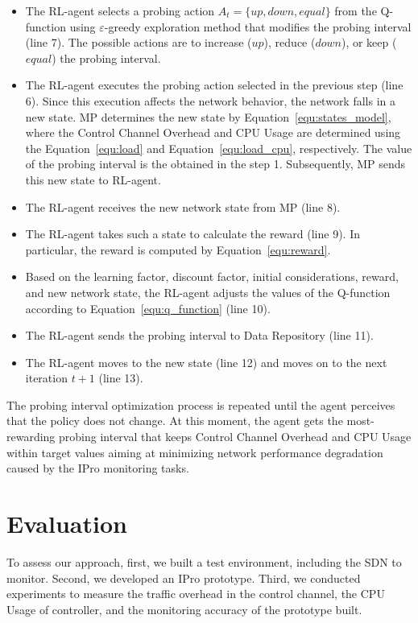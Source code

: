 \begin{itemize}
    \item The RL-agent selects a probing action $A_{t}= \{up, down, equal\}$ from the Q-function using $\varepsilon$-greedy exploration method that modifies the probing interval (line 7). The possible actions are to increase ($up$), reduce ($down$), or keep ($equal$) the probing interval.
    \item The RL-agent executes the probing action selected in the previous step (line 6). Since this execution affects the network behavior, the network falls in a new state. MP determines the new state by Equation~\ref{equ:states_model}, where the Control Channel Overhead and CPU Usage are determined using the Equation~\ref{equ:load} and Equation~\ref{equ:load_cpu}, respectively. The value of the probing interval is the obtained in the step 1. Subsequently, MP sends this new state to RL-agent.
    \item The RL-agent receives the new network state from MP (line 8). 
    \item The RL-agent takes such a state to calculate the reward (line 9). In particular, the reward is computed by Equation~\ref{equ:reward}.
    \item Based on the learning factor, discount factor, initial considerations, reward, and new network state, the RL-agent adjusts the values of the Q-function according to Equation~\ref{equ:q_function} (line 10).
    \item The RL-agent sends the probing interval to Data Repository (line 11).
    \item The RL-agent moves to the new state (line 12) and moves on to the next iteration $t+1$ (line 13).
\end{itemize}

The probing interval optimization process is repeated until the agent perceives that the policy does not change. At this moment, the agent gets the most-rewarding probing interval that keeps Control Channel Overhead and CPU Usage within target values aiming at minimizing network performance degradation caused by the IPro monitoring tasks.

\section{Evaluation}
\label{sec:experimental_evaluation}
To assess our approach, first, we built a test environment, including the SDN to monitor. Second, we developed an IPro prototype. Third, we conducted experiments to measure the traffic overhead in the control channel, the CPU Usage of controller, and the monitoring accuracy of the prototype built. 

